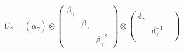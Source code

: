 \begin{equation}
U_{\gamma}=(\alpha_{\gamma}) \otimes \left(\begin{array}{ccc}\beta_{\gamma}&&\\&\beta_{\gamma}&\\&&
\beta^{-2}_{\gamma}\end{array}\right) \otimes \left( \begin{array}{ccc}\delta_{\gamma} &&\\&
\delta^{-1}_{\gamma}&\\&&
\end{array}\right) 
\end{equation} 
